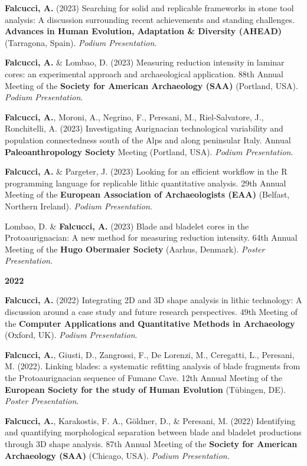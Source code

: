 \documentclass[11pt,a4paper,]{awesome-cv}
\begin{document}
\textbf{Falcucci, A.} (2023) Searching for solid and replicable
frameworks in stone tool analysis: A discussion surrounding recent
achievements and standing challenges. \textbf{Advances in Human
Evolution, Adaptation \& Diversity (AHEAD)} (Tarragona, Spain).
\emph{Podium Presentation}.

\textbf{Falcucci, A.} \& Lombao, D. (2023) Measuring reduction intensity
in laminar cores: an experimental approach and archaeological
application. 88th Annual Meeting of the \textbf{Society for American
Archaeology (SAA)} (Portland, USA). \emph{Podium Presentation}.

\textbf{Falcucci, A.}, Moroni, A., Negrino, F., Peresani, M.,
Riel-Salvatore, J., Ronchitelli, A. (2023) Investigating Aurignacian
technological variability and population connectedness south of the Alps
and along peninsular Italy. Annual \textbf{Paleoanthropology Society}
Meeting (Portland, USA). \emph{Podium Presentation}.

\textbf{Falcucci, A.} \& Pargeter, J. (2023) Looking for an efficient
workflow in the R programming language for replicable lithic
quantitative analysis. 29th Annual Meeting of the \textbf{European
Association of Archaeologists (EAA)} (Belfast, Northern Ireland).
\emph{Podium Presentation}.

Lombao, D. \& \textbf{Falcucci, A.} (2023) Blade and bladelet cores in
the Protoaurignacian: A new method for measuring reduction intensity.
64th Annual Meeting of the \textbf{Hugo Obermaier Society} (Aarhus,
Denmark). \emph{Poster Presentation}.

\setlength{\leftskip}{0cm}

\textbf{2022}

\setlength{\leftskip}{1cm}

\textbf{Falcucci, A.} (2022) Integrating 2D and 3D shape analysis in
lithic technology: A discussion around a case study and future research
perspectives. 49th Meeting of the \textbf{Computer Applications and
Quantitative Methods in Archaeology} (Oxford, UK). \emph{Podium
Presentation}.

\textbf{Falcucci, A.}, Giusti, D., Zangrossi, F., De Lorenzi, M.,
Ceregatti, L., Peresani, M. (2022). Linking blades: a systematic
refitting analysis of blade fragments from the Protoaurignacian sequence
of Fumane Cave. 12th Annual Meeting of the \textbf{European Society for
the study of Human Evolution} (Tübingen, DE). \emph{Poster
Presentation}.

\textbf{Falcucci, A.}, Karakostis, F. A., Göldner, D., \& Peresani, M.
(2022) Identifying and quantifying morphological separation between
blade and bladelet productions through 3D shape analysis. 87th Annual
Meeting of the \textbf{Society for American Archaeology (SAA)} (Chicago,
USA). \emph{Podium Presentation}.
\end{document}
